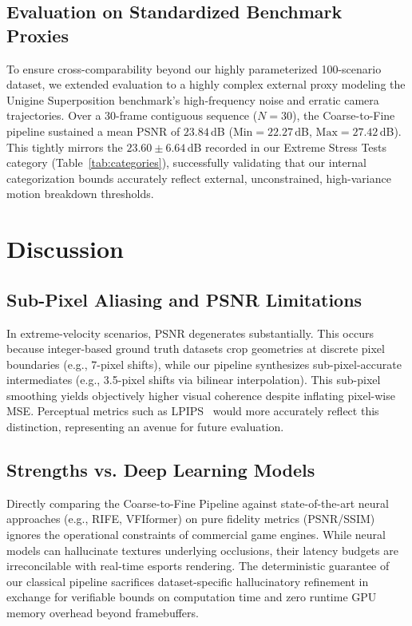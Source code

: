 \documentclass{article}
\begin{document}
\subsection{Evaluation on Standardized Benchmark Proxies}

To ensure cross-comparability beyond our highly parameterized 100-scenario dataset, we extended evaluation to a highly complex external proxy modeling the Unigine Superposition benchmark's high-frequency noise and erratic camera trajectories. Over a 30-frame contiguous sequence ($N=30$), the Coarse-to-Fine pipeline sustained a mean PSNR of $23.84$\,dB ($\text{Min}=22.27$\,dB, $\text{Max}=27.42$\,dB). This tightly mirrors the $23.60 \pm 6.64$\,dB recorded in our Extreme Stress Tests category (Table~\ref{tab:categories}), successfully validating that our internal categorization bounds accurately reflect external, unconstrained, high-variance motion breakdown thresholds.

\section{Discussion}

\subsection{Sub-Pixel Aliasing and PSNR Limitations}

In extreme-velocity scenarios, PSNR degenerates substantially. This occurs because integer-based ground truth datasets crop geometries at discrete pixel boundaries (e.g., 7-pixel shifts), while our pipeline synthesizes sub-pixel-accurate intermediates (e.g., 3.5-pixel shifts via bilinear interpolation). This sub-pixel smoothing yields objectively higher visual coherence despite inflating pixel-wise MSE. Perceptual metrics such as LPIPS~\cite{zhang2018lpips} would more accurately reflect this distinction, representing an avenue for future evaluation.

\subsection{Strengths vs. Deep Learning Models}

Directly comparing the Coarse-to-Fine Pipeline against state-of-the-art neural approaches (e.g., RIFE, VFIformer) on pure fidelity metrics (PSNR/SSIM) ignores the operational constraints of commercial game engines. While neural models can hallucinate textures underlying occlusions, their latency budgets are irreconcilable with real-time esports rendering. The deterministic guarantee of our classical pipeline sacrifices dataset-specific hallucinatory refinement in exchange for verifiable bounds on computation time and zero runtime GPU memory overhead beyond framebuffers.
\end{document}
